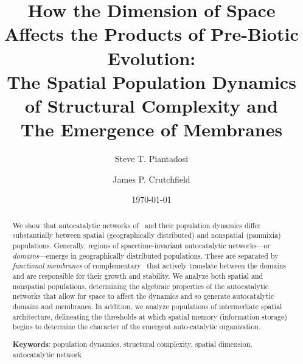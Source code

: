 \documentclass[pre,twocolumn,showpacs,superscriptaddress,preprintnumbers,floatfix]{revtex4}
\theoremstyle{plain}    \newtheorem{Lem}{Lemma}
\theoremstyle{plain}    \newtheorem*{ProLem}{Proof}
\theoremstyle{plain}    \newtheorem{Cor}{Corollary}
\theoremstyle{plain}    \newtheorem*{ProCor}{Proof}
\theoremstyle{plain}    \newtheorem{The}{Theorem}
\theoremstyle{plain}    \newtheorem*{ProThe}{Proof}
\theoremstyle{plain}    \newtheorem{Prop}{Proposition}
\theoremstyle{plain}    \newtheorem*{ProProp}{Proof}
\theoremstyle{plain}    \newtheorem*{Conj}{Conjecture}
\theoremstyle{plain}    \newtheorem*{Rem}{Remark}
\theoremstyle{plain}    \newtheorem{Def}{Definition}
\theoremstyle{plain}    \newtheorem*{Not}{Notation}
\begin{document}
\title{How the Dimension of Space Affects the Products of Pre-Biotic Evolution:\\
The Spatial Population Dynamics of Structural Complexity and\\
The Emergence of Membranes}

\author{Steve T. Piantadosi}

\author{James P. Crutchfield}

\date{\today}



\begin{abstract}
We show that autocatalytic networks of \eMs\ and their population dynamics
differ substantially between spatial (geographically distributed) and nonspatial
(panmixia) populations. Generally, regions of spacetime-invariant autocatalytic
networks---or \emph{domains}---emerge in geographically distributed populations.
These are separated by \emph{functional membranes} of complementary \eMs\ that
actively translate between the domains and are responsible for their growth and
stability. We analyze both spatial and nonspatial populations, determining the
algebraic properties of the autocatalytic networks that allow for space to
affect the dynamics and so generate autocatalytic domains and membranes. In
addition, we analyze populations of intermediate spatial architecture,
delineating the thresholds at which spatial memory (information storage)
begins to determine the character of the emergent auto-catalytic organization.

\vspace{0.1in}
\noindent
{\bf Keywords}: population dynamics, structural complexity, spatial dimension,
autocatalytic network

\end{abstract}

%
\end{document}
